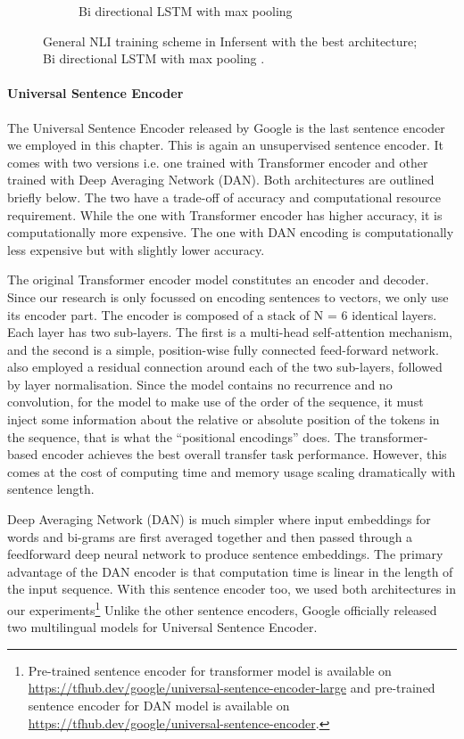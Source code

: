\begin{figure}
\begin{subfigure}[b]{.5\textwidth}
		\caption{Bi directional LSTM  with max pooling}
		\label{fig:infersent_architecture}
	\end{subfigure}
	\caption[Infersent Architecture]{General NLI training scheme in Infersent with the best architecture; Bi directional LSTM  with max pooling \cite{conneau-EtAl:2017:EMNLP2017}. }
	\label{fig:infersent}
\end{figure}

\paragraph{Universal Sentence Encoder}

The Universal Sentence Encoder \cite{cer2018universal} released by Google is the last sentence encoder we employed in this chapter. This is again an unsupervised sentence encoder. It comes with two versions i.e. one trained with Transformer encoder and other trained with Deep Averaging Network
(DAN). Both architectures are outlined briefly below. The two have a trade-off of accuracy and computational resource requirement. While the one with Transformer encoder has higher accuracy, it is computationally more expensive. The one with DAN encoding is computationally less expensive but with slightly lower accuracy.

The original Transformer encoder model constitutes an encoder and decoder. Since our research is only focussed on encoding sentences to vectors, we only use its encoder part. The encoder is composed of a stack of N = 6 identical layers. Each layer has two sub-layers. The first is a multi-head self-attention mechanism, and the second is a simple, position-wise fully connected feed-forward network. \citet{cer2018universal} also employed a residual connection around each of the two sub-layers,
followed by layer normalisation. Since the model contains no recurrence and no convolution, for the model to make use of the order of the sequence, it must inject some information about the relative or absolute position of the tokens in the sequence, that is what the “positional encodings” does. The transformer-based encoder achieves the best overall transfer task performance. However, this comes at the cost of computing time and memory usage scaling dramatically with sentence length.

Deep Averaging Network (DAN) is much simpler where input embeddings for words and bi-grams are first averaged together and then passed through a feedforward deep neural network to produce sentence embeddings. The primary advantage of the DAN encoder is that computation time is linear in the length of the input sequence. With this sentence encoder too, we used both architectures in our experiments\footnote{Pre-trained sentence encoder for transformer model is available on \url{https://tfhub.dev/google/universal-sentence-encoder-large} and pre-trained sentence encoder for DAN model is available on \url{https://tfhub.dev/google/universal-sentence-encoder}.} Unlike the other sentence encoders, Google officially released two multilingual models for Universal Sentence Encoder.

